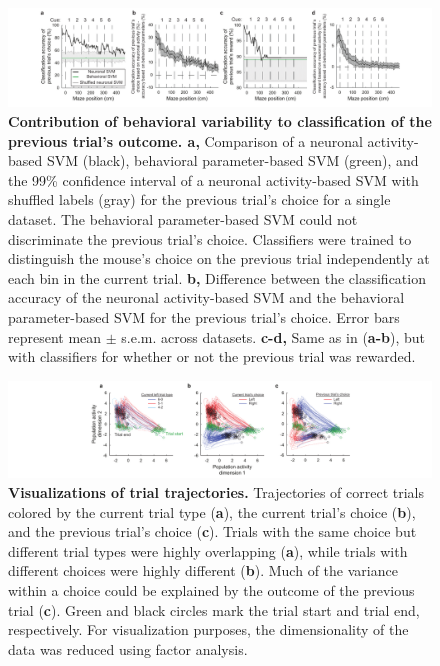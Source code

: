 \begin{figure}
\includegraphics[width=1.2\textwidth,center]{figures/fig_3_13.pdf}
\caption[Contribution of behavioral variability to classification of the previous trial's outcome.]
{\textbf{Contribution of behavioral variability to classification of the previous trial's outcome. a,} Comparison of a neuronal activity-based SVM (black), behavioral parameter-based SVM (green), and the 99\% confidence interval of a neuronal activity-based SVM with shuffled labels (gray) for the previous trial's choice for a single dataset. The behavioral parameter-based SVM could not discriminate the previous trial's choice. Classifiers were trained to distinguish the mouse's choice on the previous trial independently at each bin in the current trial. 
%
\textbf{b,} Difference between the classification accuracy of the neuronal activity-based SVM and the behavioral parameter-based SVM for the previous trial's choice. Error bars represent mean $\pm$ s.e.m. across datasets. 
%
\textbf{c-d,} Same as in (\textbf{a-b}), but with classifiers for whether or not the previous trial was rewarded.
\label{fig:3_13}}
\end{figure}

\begin{figure}
\includegraphics[width=1.5\textwidth,center]{figures/fig_3_14.pdf}
\caption[Visualizations of trial trajectories.]
{\textbf{Visualizations of trial trajectories.} Trajectories of correct trials colored by the current trial type (\textbf{a}), the current trial's choice (\textbf{b}), and the previous trial's choice (\textbf{c}). Trials with the same choice but different trial types were highly overlapping (\textbf{a}), while trials with different choices were highly different (\textbf{b}). Much of the variance within a choice could be explained by the outcome of the previous trial (\textbf{c}). Green and black circles mark the trial start and trial end, respectively. For visualization purposes, the dimensionality of the data was reduced using factor analysis. 
\label{fig:3_14}}
\end{figure}

